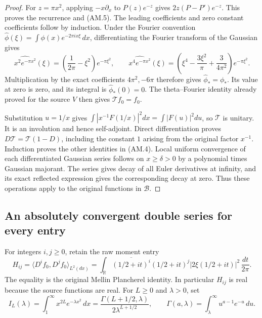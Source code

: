 \begin{proof}
For \(z=\pi x^2\), applying \(-x\partial_x\) to
\(P(z)e^{-z}\) gives \(2z(P-P')e^{-z}\).  This proves the
recurrence and (AM.5).  The leading coefficients and zero constant
coefficients follow by induction.  Under the Fourier convention
\(\widehat\phi(\xi)=\int\phi(x)e^{-2\pi ix\xi}\,dx\),
differentiating the Fourier transform of the Gaussian gives
\[
 \widehat{x^2e^{-\pi x^2}}(\xi)
  =\left(\frac1{2\pi}-\xi^2\right)e^{-\pi\xi^2},\qquad
 \widehat{x^4e^{-\pi x^2}}(\xi)
  =\left(\xi^4-\frac{3\xi^2}{\pi}
                    +\frac3{4\pi^2}\right)e^{-\pi\xi^2}.
\]
Multiplication by the exact coefficients \(4\pi^2,-6\pi\)
therefore gives \(\widehat\phi_* =\phi_*\).  Its value at zero
is zero, and its integral is \(\widehat\phi_*(0)=0\).
The theta--Fourier identity already proved for the source \(V\)
then gives \(\mathcal Tf_0=f_0\).

Substitution \(u=1/x\) gives
\(\int|x^{-1}F(1/x)|^2dx=\int|F(u)|^2du\), so \(\mathcal T\)
is unitary.  It is an involution and hence self-adjoint.  Direct
differentiation proves \(D\mathcal T=\mathcal T(1-D)\), including
the constant \(1\) arising from the original factor \(x^{-1}\).
Induction proves the other identities in (AM.4).  Local uniform
convergence of each differentiated Gaussian series follows on
\(x\geq\delta>0\) by a polynomial times Gaussian majorant.  The
series gives decay of all Euler derivatives at infinity, and its
exact reflected expression gives the corresponding decay at zero.
Thus these operations apply to the original functions in
\(\mathscr B\).
\end{proof}

\subsection{An absolutely convergent double series for every entry}

For integers \(i,j\geq0\), retain the raw moment entry
\[
 H_{ij}=\langle D^if_0,D^jf_0\rangle_{L^2(dx)}
  =\int_{\mathbb R}
    \overline{(1/2+it)^i}(1/2+it)^j
       |2\xi(1/2+it)|^2\,\frac{dt}{2\pi}.
 \tag{AM.6}
\]
The equality is the original Mellin Plancherel identity.  In
particular \(H_{ij}\) is real because the source functions are real.
For \(L\geq0\) and \(\lambda>0\), set
\[
 I_L(\lambda)=\int_1^\infty x^{2L}e^{-\lambda x^2}\,dx
   =\frac{\Gamma(L+1/2,\lambda)}{2\lambda^{L+1/2}},
 \qquad
 \Gamma(a,\lambda)=\int_\lambda^\infty u^{a-1}e^{-u}\,du.
 \tag{AM.7}
\]

